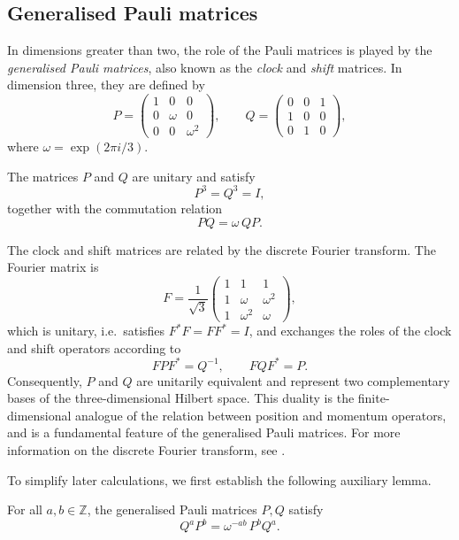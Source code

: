 \subsection{Generalised Pauli matrices}
\label{subsec:generalised-pauli-matrices}

In dimensions greater than two, the role of the Pauli matrices is played
by the \emph{generalised Pauli matrices}, also known as the \emph{clock}
and \emph{shift} matrices. In dimension three, they are defined by
\[
    P =
    \begin{pmatrix} 1 & 0 & 0 \\ 0 & \omega & 0 \\ 0 & 0 & \omega^2
    \end{pmatrix}, \qquad
    Q =
    \begin{pmatrix} 0 & 0 & 1 \\ 1 & 0 & 0 \\ 0 & 1 & 0
    \end{pmatrix},
\]
where \( \omega = \exp(2\pi i/3) \).

The matrices \( P \) and \( Q \) are unitary and satisfy
\[
    P^3 = Q^3 = I,
\]
together with the commutation relation
\[
    PQ = \omega\, QP.
\]

The clock and shift matrices are related by the discrete Fourier
transform. The Fourier matrix is
\[
    F = \frac{1}{\sqrt{3}}
    \begin{pmatrix} 1 & 1 & 1 \\ 1 & \omega & \omega^2 \\ 1 & \omega^2 & \omega
    \end{pmatrix},
\]
which is unitary, i.e.\ satisfies \( F^*F = FF^* = I \), and exchanges
the roles of the clock and shift operators according to
\[
    FPF^* = Q^{-1}, \qquad FQF^* = P.\label{dft-relations}
\]
Consequently, \( P \) and \( Q \) are unitarily equivalent and represent
two complementary bases of the three-dimensional Hilbert space. This
duality is the finite-dimensional analogue of the relation between
position and momentum operators, and is a fundamental feature of the
generalised Pauli matrices. For more information on the discrete Fourier
transform, see \textcite{rao01}.

To simplify later calculations, we first establish the following
auxiliary lemma.

\begin{lemma}
    \label{lemma:qp-commutation}
    For all \( a, b \in \mathbb{Z} \), the generalised Pauli
    matrices \( P, Q \) satisfy
    \[
        Q^a P^b = \omega^{-ab}\, P^b Q^a.
    \]
\end{lemma}


